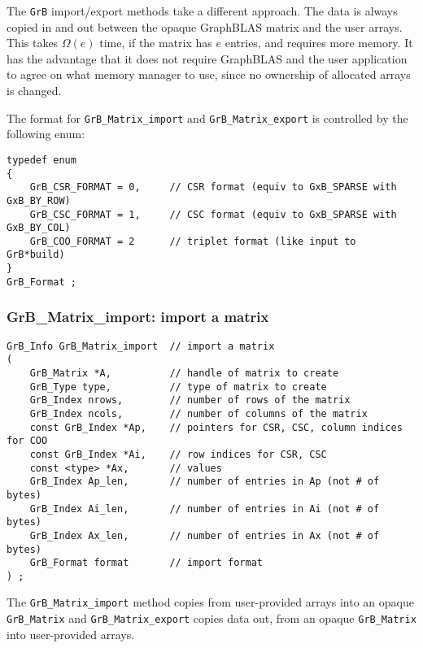 \documentclass[12pt]{article}
\begin{document}
The \verb'GrB' import/export methods take a different approach.  The data
is always copied in and out between the opaque GraphBLAS matrix and the
user arrays.  This takes $\Omega(e)$ time, if the matrix has $e$ entries,
and requires more memory.  It has the advantage that it does not require
GraphBLAS and the user application to agree on what memory manager to use,
since no ownership of allocated arrays is changed.

The format for \verb'GrB_Matrix_import' and \verb'GrB_Matrix_export' is
controlled by the following enum:

{\footnotesize
\begin{verbatim}
typedef enum
{
    GrB_CSR_FORMAT = 0,     // CSR format (equiv to GxB_SPARSE with GxB_BY_ROW)
    GrB_CSC_FORMAT = 1,     // CSC format (equiv to GxB_SPARSE with GxB_BY_COL)
    GrB_COO_FORMAT = 2      // triplet format (like input to GrB*build)
}
GrB_Format ; \end{verbatim}}

\newpage
\subsubsection{{\sf GrB\_Matrix\_import:}  import a matrix}
\label{GrB_matrix_import}

\begin{mdframed}[userdefinedwidth=6in]
{\footnotesize
\begin{verbatim}
GrB_Info GrB_Matrix_import  // import a matrix
(
    GrB_Matrix *A,          // handle of matrix to create
    GrB_Type type,          // type of matrix to create
    GrB_Index nrows,        // number of rows of the matrix
    GrB_Index ncols,        // number of columns of the matrix
    const GrB_Index *Ap,    // pointers for CSR, CSC, column indices for COO
    const GrB_Index *Ai,    // row indices for CSR, CSC
    const <type> *Ax,       // values
    GrB_Index Ap_len,       // number of entries in Ap (not # of bytes)
    GrB_Index Ai_len,       // number of entries in Ai (not # of bytes)
    GrB_Index Ax_len,       // number of entries in Ax (not # of bytes)
    GrB_Format format       // import format
) ;
\end{verbatim}
} \end{mdframed}

The \verb'GrB_Matrix_import' method copies from user-provided arrays into an
opaque \verb'GrB_Matrix' and \verb'GrB_Matrix_export' copies data out, from an
opaque \verb'GrB_Matrix' into user-provided arrays.
\end{document}

